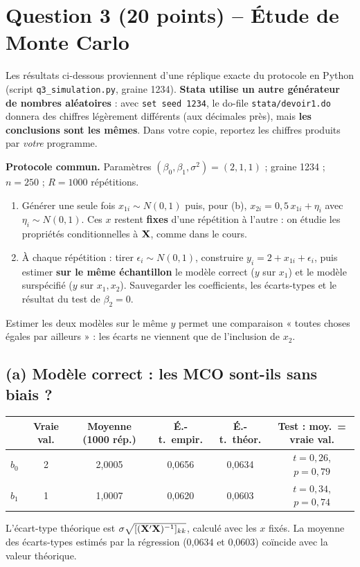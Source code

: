 \documentclass[11pt,a4paper]{article}
\begin{document}
\section{Question 3 (20 points) -- Étude de Monte Carlo}

\begin{attention}[title={Note sur les chiffres}]
Les résultats ci-dessous proviennent d'une réplique exacte du protocole en Python (script \texttt{q3\_simulation.py}, graine 1234). \textbf{Stata utilise un autre générateur de nombres aléatoires} : avec \texttt{set seed 1234}, le do-file \texttt{stata/devoir1.do} donnera des chiffres légèrement différents (aux décimales près), mais \textbf{les conclusions sont les mêmes}. Dans votre copie, reportez les chiffres produits par \emph{votre} programme.
\end{attention}

\textbf{Protocole commun.} Paramètres $(\beta_0,\beta_1,\sigma^2)=(2,1,1)$ ; graine 1234 ; $n=250$ ; $R=1000$ répétitions.
\begin{enumerate}[nosep]
\item Générer une seule fois $x_{1i}\sim N(0,1)$ puis, pour (b), $x_{2i}=0{,}5\,x_{1i}+\eta_i$ avec $\eta_i\sim N(0,1)$. Ces $x$ restent \textbf{fixes} d'une répétition à l'autre : on étudie les propriétés conditionnelles à $\mathbf{X}$, comme dans le cours.
\item À chaque répétition : tirer $\epsilon_i\sim N(0,1)$, construire $y_i=2+x_{1i}+\epsilon_i$, puis estimer \textbf{sur le même échantillon} le modèle correct ($y$ sur $x_1$) et le modèle surspécifié ($y$ sur $x_1,x_2$). Sauvegarder les coefficients, les écarts-types et le résultat du test de $\beta_2=0$.
\end{enumerate}
Estimer les deux modèles sur le même $y$ permet une comparaison « toutes choses égales par ailleurs » : les écarts ne viennent que de l'inclusion de $x_2$.

\subsection{(a) Modèle correct : les MCO sont-ils sans biais ?}

\begin{center}
\begin{tabular}{@{}lccccc@{}}
\toprule
& Vraie val. & Moyenne (1000 rép.) & É.-t.\ empir. & É.-t.\ théor. & Test : moy.\ = vraie val. \\
\midrule
$b_0$ & 2 & 2,0005 & 0,0656 & 0,0634 & $t=0{,}26$, $p=0{,}79$ \\
$b_1$ & 1 & 1,0007 & 0,0620 & 0,0603 & $t=0{,}34$, $p=0{,}74$ \\
\bottomrule
\end{tabular}
\end{center}
L'écart-type théorique est $\sigma\sqrt{[(\mathbf{X}'\mathbf{X})^{-1}]_{kk}}$, calculé avec les $x$ fixés. La moyenne des écarts-types estimés par la régression (0,0634 et 0,0603) coïncide avec la valeur théorique.
\end{document}
